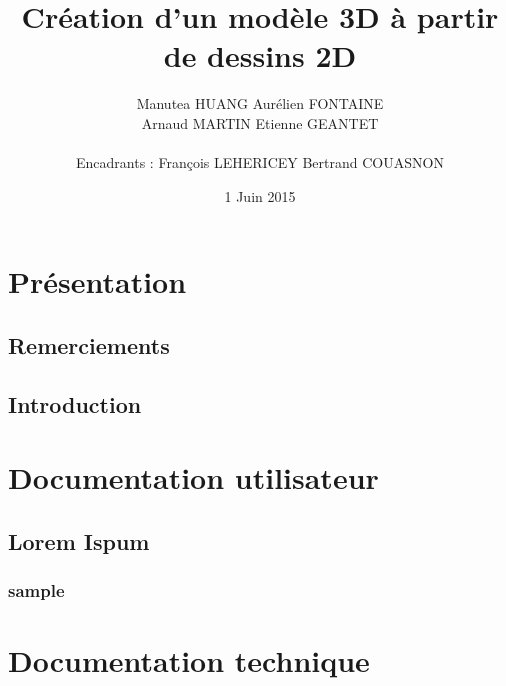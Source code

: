 \documentclass[a4paper,11pt]{article}
\title{ \textbf{Création d'un modèle 3D à partir de dessins 2D} }
\author{ Manutea \textsc{HUANG} Aurélien \textsc{FONTAINE} \\
	Arnaud \textsc{MARTIN} Etienne \textsc{GEANTET} \\
	\\
	Encadrants : François \textsc{LEHERICEY}	Bertrand \textsc{COUASNON}}
\date{1 Juin 2015}                    %
\begin{document}
\maketitle                 %
\thispagestyle{empty}      %

\begin{abstract}
\end{abstract}
	
	\section{Présentation}
		\subsection{Remerciements}
		
		\subsection{Introduction}
	
	\section{Documentation utilisateur}
		\subsection{Lorem Ispum}
		
			\subsubsection{sample}
			
	\section{Documentation technique}
	
\end{document}
